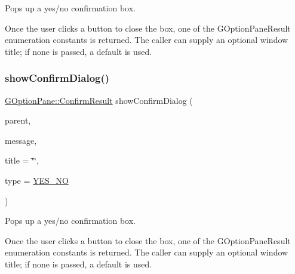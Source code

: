 Pops up a yes/no confirmation box. 

Once the user clicks a button to close the box, one of the G\+Option\+Pane\+Result enumeration constants is returned. The caller can supply an optional window title; if none is passed, a default is used. \mbox{\label{classGOptionPane_a67b4bfe05d029f3575a4b9e341e786ec}} 
\subsubsection{\texorpdfstring{show\+Confirm\+Dialog()}{showConfirmDialog()}\hspace{0.1cm}{\footnotesize\ttfamily [2/3]}}
{\footnotesize\ttfamily \mbox{\hyperlink{classGOptionPane_a1cc9e8685029e39646671ed71f32d47d}{G\+Option\+Pane\+::\+Confirm\+Result}} show\+Confirm\+Dialog (\begin{DoxyParamCaption}\item[{\mbox{\hyperlink{classGWindow}{G\+Window}} $\ast$}]{parent,  }\item[{const std\+::string \&}]{message,  }\item[{const std\+::string \&}]{title = {\ttfamily \char`\"{}\char`\"{}},  }\item[{\mbox{\hyperlink{classGOptionPane_a6a1aaf19c06f5a6bef89ea6415547049}{Confirm\+Type}}}]{type = {\ttfamily \mbox{\hyperlink{classGOptionPane_a6a1aaf19c06f5a6bef89ea6415547049a23d16d66a433471aa62deadacecfc08d}{Y\+E\+S\+\_\+\+NO}}} }\end{DoxyParamCaption})\hspace{0.3cm}{\ttfamily [static]}}



Pops up a yes/no confirmation box. 

Once the user clicks a button to close the box, one of the G\+Option\+Pane\+Result enumeration constants is returned. The caller can supply an optional window title; if none is passed, a default is used. \mbox{\label{classGOptionPane_a19401c5fe238589904bc44319cc80b41}} 
